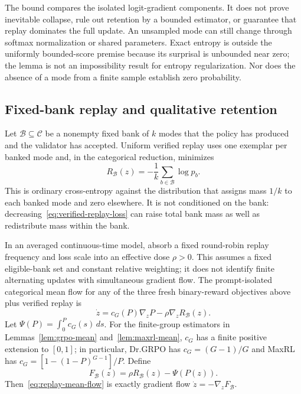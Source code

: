 \documentclass{article}
\newcommand{\1}{\mathbf 1}
\theoremstyle{remark}
\theoremstyle{definition}
\theoremstyle{plain}
\begin{document}
The bound compares the isolated logit-gradient components. It does not prove
inevitable collapse, rule out retention by a bounded estimator, or guarantee
that replay dominates the full update. An unsampled mode can still change
through softmax normalization or shared parameters. Exact entropy is outside
the uniformly bounded-score premise because its surprisal is unbounded near
zero; the lemma is not an impossibility result for entropy regularization.
Nor does the absence of a mode from a finite sample establish zero probability.


\subsection{Fixed-bank replay and qualitative retention}
\label{app:theory-replay}

Let $\mathcal B\subseteq\mathcal C$ be a nonempty fixed bank of $k$ modes that
the policy has produced and the validator has accepted. Uniform verified replay
uses one exemplar per banked mode and, in the categorical reduction, minimizes
\begin{equation}
  R_{\mathcal B}(z)
  =-\frac1k\sum_{b\in\mathcal B}\log p_b.
  \label{eq:verified-replay-loss}
\end{equation}
This is ordinary cross-entropy against the distribution that assigns mass
$1/k$ to each banked mode and zero elsewhere. It is not conditioned on the
bank: decreasing~\eqref{eq:verified-replay-loss} can raise total bank mass as
well as redistribute mass within the bank.

In an averaged continuous-time model, absorb a fixed round-robin replay
frequency and loss scale into an effective dose $\rho>0$. This assumes a
fixed eligible-bank set and constant relative weighting; it does not identify
finite alternating updates with simultaneous gradient flow. The prompt-isolated categorical mean flow for any of the three fresh
binary-reward objectives above plus verified replay is
\begin{equation}
  \dot z
  =c_G(P)\nabla_zP-\rho\nabla_zR_{\mathcal B}(z).
  \label{eq:replay-mean-flow}
\end{equation}
Let $\Psi(P)=\int_0^P c_G(s)\,ds$. For the finite-group estimators in Lemmas~\ref{lem:grpo-mean}
and~\ref{lem:maxrl-mean}, $c_G$ has a finite positive extension to $[0,1]$;
in particular, Dr.GRPO has $c_G=(G-1)/G$ and MaxRL has
$c_G=[1-(1-P)^{G-1}]/P$. Define
\begin{equation}
  F_{\mathcal B}(z)=\rho R_{\mathcal B}(z)-\Psi(P(z)).
  \label{eq:replay-potential}
\end{equation}
Then~\eqref{eq:replay-mean-flow} is exactly gradient flow
$\dot z=-\nabla_zF_{\mathcal B}$.
\end{document}
